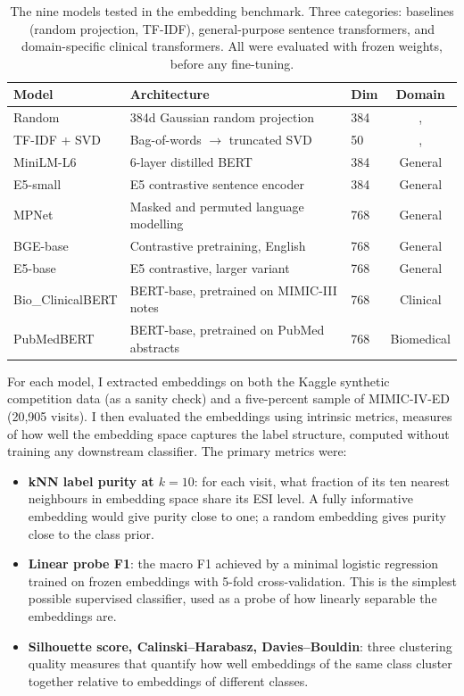 \begin{table}[htbp]
 \centering
 \caption[Embedding models tested in the benchmark]{The nine models tested in the embedding benchmark. Three categories: baselines (random projection, TF-IDF), general-purpose sentence transformers, and domain-specific clinical transformers. All were evaluated with frozen weights, before any fine-tuning.}
 \label{tab:embedding-models}
 \small
 \begin{tabular}{lllc}
 \toprule
 Model & Architecture & Dim & Domain \\
 \midrule
 Random & 384d Gaussian random projection & 384 &, \\
 TF-IDF + SVD & Bag-of-words $\to$ truncated SVD & 50 &, \\
 MiniLM-L6 & 6-layer distilled BERT & 384 & General \\
 E5-small & E5 contrastive sentence encoder & 384 & General \\
 MPNet & Masked and permuted language modelling & 768 & General \\
 BGE-base & Contrastive pretraining, English & 768 & General \\
 E5-base & E5 contrastive, larger variant & 768 & General \\
 Bio\_ClinicalBERT & BERT-base, pretrained on MIMIC-III notes & 768 & Clinical \\
 PubMedBERT & BERT-base, pretrained on PubMed abstracts & 768 & Biomedical \\
 \bottomrule
 \end{tabular}
\end{table}

For each model, I extracted embeddings on both the Kaggle synthetic competition data (as a sanity check) and a five-percent sample of MIMIC-IV-ED (20,905 visits). I then evaluated the embeddings using intrinsic metrics, measures of how well the embedding space captures the label structure, computed without training any downstream classifier. The primary metrics were:

\begin{itemize}
 \item \textbf{kNN label purity at $k=10$}: for each visit, what fraction of its ten nearest neighbours in embedding space share its ESI level. A fully informative embedding would give purity close to one; a random embedding gives purity close to the class prior.
 \item \textbf{Linear probe F1}: the macro F1 achieved by a minimal logistic regression trained on frozen embeddings with 5-fold cross-validation. This is the simplest possible supervised classifier, used as a probe of how linearly separable the embeddings are.
 \item \textbf{Silhouette score, Calinski--Harabasz, Davies--Bouldin}: three clustering quality measures that quantify how well embeddings of the same class cluster together relative to embeddings of different classes.
\end{itemize}

